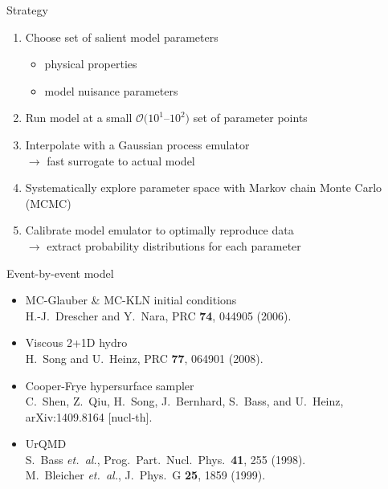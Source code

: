 \documentclass{beamer}
\begin{document}
\begin{frame}{Strategy}
  \begin{enumerate}
    \item Choose set of salient model parameters
      \begin{itemize}
        \item physical properties
        \item model nuisance parameters
      \end{itemize}
    \item Run model at a small $\mathcal O(10^1$--$10^2)$ set of parameter points
    \item Interpolate with a Gaussian process emulator \\
      $\rightarrow$ fast surrogate to actual model
    \item Systematically explore parameter space with Markov chain Monte Carlo (MCMC)
    \item Calibrate model emulator to optimally reproduce data \\
      $\rightarrow$ extract probability distributions for each parameter
  \end{enumerate}
\end{frame}


\begin{frame}{Event-by-event model}
  \begin{itemize}
    \item MC-Glauber \& MC-KLN initial conditions \\
      \hspace{1em} {\tiny H.-J.\ Drescher and Y.\ Nara, PRC {\bf 74}, 044905 (2006).}
    \item Viscous 2+1D hydro \\
      \hspace{1em} {\tiny H.\ Song and U.\ Heinz, PRC {\bf 77}, 064901 (2008).}
    \item Cooper-Frye hypersurface sampler \\
      \hspace{1em} {\tiny C.~Shen, Z.~Qiu, H.~Song, J.~Bernhard, S.~Bass, and U.~Heinz, arXiv:1409.8164 [nucl-th].}
    \item UrQMD \\
      \hspace{1em} {\tiny S.\ Bass \emph{et.\ al.}, Prog.\ Part.\ Nucl.\ Phys.\  {\bf 41}, 255 (1998).} \\[-1ex]
      \hspace{1em} {\tiny M.\ Bleicher \emph{et.\ al.}, J.\ Phys.\ G {\bf 25}, 1859 (1999).}
  \end{itemize}
\end{frame}
\end{document}
